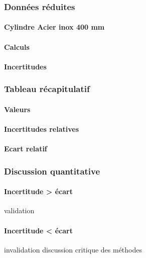 \newpage

\subsubsection{\large Données réduites}

\paragraph{\large Cylindre Acier inox 400 mm}
\paragraph{Calculs}
\paragraph{Incertitudes}

\newpage

\subsubsection{\large Tableau récapitulatif}
\paragraph{Valeurs}
\paragraph{Incertitudes relatives}
\paragraph{Ecart relatif}

\subsubsection{\large Discussion quantitative}
\paragraph{Incertitude > écart}
validation
\paragraph{Incertitude < écart}
invalidation
discussion critique des méthodes